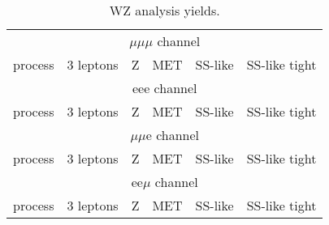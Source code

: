 \documentclass[a4paper]{article}
\begin{document}
\begin{table}[ht]
\begin{center}
\begin{tabular}{l|r|r|r|r|r}
\hline
\multicolumn{6}{c}{$\mu\mu\mu$ channel}\\
process & 3 leptons & Z & MET & SS-like & SS-like tight\\
\hline

\hline
\hline
\multicolumn{6}{c}{eee channel}\\
process & 3 leptons & Z & MET & SS-like & SS-like tight\\
\hline

\hline
\hline
\multicolumn{6}{c}{$\mu\mu$e channel}\\
process & 3 leptons & Z & MET & SS-like & SS-like tight\\
\hline

\hline
\hline
\multicolumn{6}{c}{ee$\mu$ channel}\\
process & 3 leptons & Z & MET & SS-like & SS-like tight\\
\hline

\hline
\end{tabular}
\caption{WZ analysis yields.}
\label{tab:wz_yields}
\end{center}
\end{table}
\end{document}
